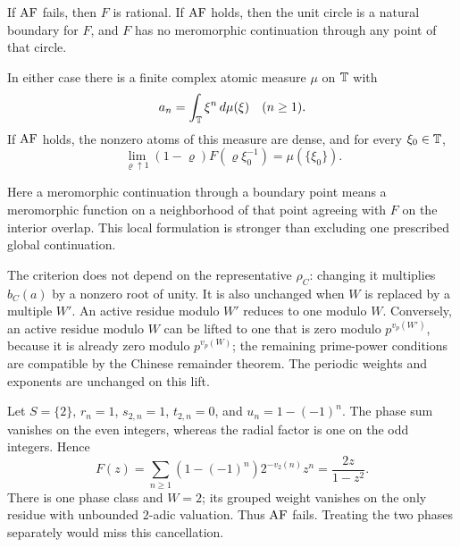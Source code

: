 \begin{theorem}\label{thm:main}
If \(\mathrm{AF}\) fails, then \(F\) is rational. If \(\mathrm{AF}\) holds, then the
unit circle is a natural boundary for \(F\), and \(F\) has no
meromorphic continuation through any point of that circle.

In either case there is a finite complex atomic measure \(\mu\) on
\(\mathbb T\) with
\begin{equation}\label{eq:moments}
a_n=\int_{\mathbb T}\xi^n\,d\mu(\xi)\quad(n\geq1).
\end{equation}
If \(\mathrm{AF}\) holds, the nonzero atoms of this measure are dense, and for
every \(\xi_0\in\mathbb T\),
\begin{equation}\label{eq:radial}
\lim_{\varrho\uparrow1}(1-\varrho)
F(\varrho\xi_0^{-1})=\mu(\{\xi_0\}).
\end{equation}
\end{theorem}

Here a meromorphic continuation through a boundary point means a
meromorphic function on a neighborhood of that point agreeing with
\(F\) on the interior overlap. This local formulation is stronger
than excluding one prescribed global continuation.

The criterion does not depend on the representative \(\rho_C\):
changing it multiplies \(b_C(a)\) by a nonzero root of unity.
It is also unchanged when \(W\) is replaced by a multiple \(W'\).
An active residue modulo \(W'\) reduces to one modulo \(W\).
Conversely, an active residue modulo \(W\) can be lifted to one that
is zero modulo \(p^{v_p(W')}\), because it is already zero modulo
\(p^{v_p(W)}\); the remaining prime-power conditions are compatible
by the Chinese remainder theorem. The periodic weights and exponents
are unchanged on this lift.

\begin{example}\label{ex:mask}
Let \(S=\{2\}\), \(r_n=1\), \(s_{2,n}=1\), \(t_{2,n}=0\), and
\(u_n=1-(-1)^n\). The phase sum vanishes on the even integers,
whereas the radial factor is one on the odd integers. Hence
\[
F(z)=\sum_{n\geq1}(1-(-1)^n)2^{-v_2(n)}z^n
=\frac{2z}{1-z^2}.
\]
There is one phase class and \(W=2\); its grouped weight vanishes on
the only residue with unbounded \(2\)-adic valuation. Thus \(\mathrm{AF}\)
fails. Treating the two phases separately would miss this cancellation.
\end{example}
